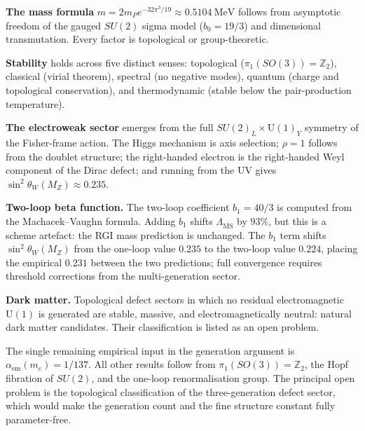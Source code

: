 \documentclass[12pt]{article}
\theoremstyle{definition}
\theoremstyle{remark}
\begin{document}
\textbf{The mass formula} $m=2m_P e^{-32\pi^3/19}\approx 0.5104\ \mathrm{MeV}$
follows from asymptotic freedom of the gauged $SU(2)$ sigma model ($b_0=19/3$)
and dimensional transmutation.  Every factor is topological or group-theoretic.

\textbf{Stability} holds across five distinct senses: topological
($\pi_1(SO(3))=\mathbb{Z}_2$), classical (virial theorem),
spectral (no negative modes), quantum (charge and topological conservation),
and thermodynamic (stable below the pair-production temperature).

\textbf{The electroweak sector} emerges from the full $SU(2)_L\times\mathrm{U}(1)_Y$
symmetry of the Fisher-frame action.  The Higgs mechanism is axis selection;
$\rho=1$ follows from the doublet structure; the right-handed electron is
the right-handed Weyl component of the Dirac defect; and running from the
UV gives $\sin^2\theta_W(M_Z)\approx 0.235$.

\textbf{Two-loop beta function.}  The two-loop coefficient $b_1=40/3$ is
computed from the Machacek--Vaughn formula.  Adding $b_1$ shifts
$\Lambda_{\overline{\mathrm{MS}}}$ by $93\%$, but this is a scheme artefact:
the RGI mass prediction is unchanged.  The $b_1$ term shifts $\sin^2\theta_W(M_Z)$ from the one-loop value $0.235$
to the two-loop value $0.224$, placing the empirical $0.231$ between the
two predictions; full convergence requires threshold corrections from the
multi-generation sector.

\textbf{Dark matter.}  Topological defect sectors in which no residual
electromagnetic $\mathrm{U}(1)$ is generated are stable, massive, and
electromagnetically neutral: natural dark matter candidates.  Their
classification is listed as an open problem.

The single remaining empirical input in the generation argument is
$\alpha_{\mathrm{em}}(m_e)=1/137$.  All other results follow from
$\pi_1(SO(3))=\mathbb{Z}_2$, the Hopf fibration of $SU(2)$, and the
one-loop renormalisation group.  The principal open problem is the
topological classification of the three-generation defect sector, which
would make the generation count and the fine structure constant fully
parameter-free.
\end{document}

